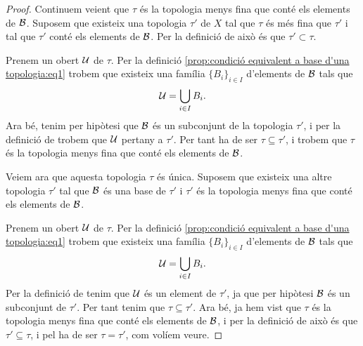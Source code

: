 \documentclass[../../Main.tex]{subfiles}
\begin{document}
\begin{proposition}
\begin{proof}
			Continuem veient que \(\tau\) és la topologia menys fina que conté els elements de \(\mathcal{B}\). Suposem que existeix una topologia \(\tau'\) de \(X\) tal que \(\tau\) és més fina que \(\tau'\) i tal que \(\tau'\) conté els elements de \(\mathcal{B}\). Per la definició de  això és que \(\tau'\subset\tau\).
			
			Prenem un obert \(\mathcal{U}\) de \(\tau\). Per la definició \eqref{prop:condició equivalent a base d'una topologia:eq1} trobem que existeix una família \(\{B_{i}\}_{i\in I}\) d'elements de \(\mathcal{B}\) tals que
			\[
			    \mathcal{U}=\bigcup_{i\in I}B_{i}.
			\]
			Ara bé, tenim per hipòtesi que \(\mathcal{B}\) és un subconjunt de la topologia \(\tau'\), i per la definició de  trobem que \(\mathcal{U}\) pertany a \(\tau'\). Per tant ha de ser \(\tau\subseteq\tau'\), i trobem que \(\tau\) és la topologia menys fina que conté els elements de \(\mathcal{B}\).
			
			Veiem ara que aquesta topologia \(\tau\) és única. Suposem que existeix una altre topologia \(\tau'\) tal que \(\mathcal{B}\) és una base de \(\tau'\) i \(\tau'\) és la topologia menys fina que conté els elements de \(\mathcal{B}\).
			
			Prenem un obert \(\mathcal{U}\) de \(\tau\). Per la definició \eqref{prop:condició equivalent a base d'una topologia:eq1} trobem que existeix una família \(\{B_{i}\}_{i\in I}\) d'elements de \(\mathcal{B}\) tals que
			\[
			    \mathcal{U}=\bigcup_{i\in I}B_{i}.
			\]
			Per la definició de  tenim que \(\mathcal{U}\) és un element de \(\tau'\), ja que per hipòtesi \(\mathcal{B}\) és un subconjunt de \(\tau'\). Per tant tenim que \(\tau\subseteq\tau'\). Ara bé, ja hem vist que \(\tau\) és la topologia menys fina que conté els elements de \(\mathcal{B}\), i per la definició de  això és que \(\tau'\subseteq\tau\), i pel  ha de ser \(\tau=\tau'\), com volíem veure.
		\end{proof}
	\end{proposition}
\end{document}
